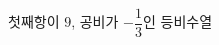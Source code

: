 \hspace*{2mm}\begin{minipage}[t]{\dimexpr\linewidth-2mm\relax}\vspace{0pt}
첫째항이 $9$, 공비가 $-\dfrac{1}{3}$인 등비수열\end{minipage}
